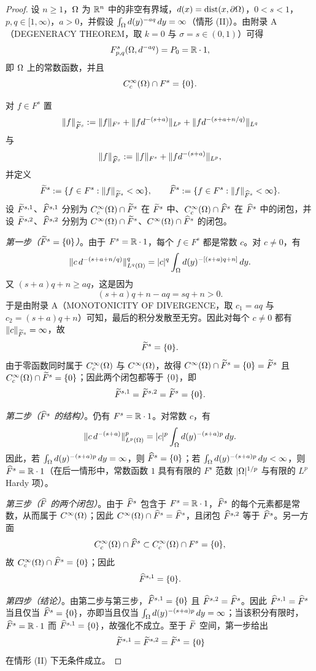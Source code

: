 \begin{proof}
设 $n\ge 1$，$\Omega$ 为 $\mathbb{R}^n$ 中的非空有界域，$d(x)=\operatorname{dist}(x,\partial\Omega)$，$0<s<1$，$p,q\in[1,\infty)$，$a>0$，并假设 $\int_\Omega d(y)^{-aq}\,dy=\infty$（情形 (II)）。由附录 A（DEGENERACY THEOREM，取 $k=0$ 与 $\sigma=s\in(0,1)$）可得
\[
  F^s_{p,q}(\Omega,d^{-aq})=P_0=\mathbb{R}\cdot 1 ,
\]
即 $\Omega$ 上的常数函数，并且
\[
  C_c^\infty(\Omega)\cap F^s=\{0\} .
\]

对 $f\in F^s$ 置
\[
  \|f\|_{\widetilde F^s}:=\|f\|_{F^s}+\|f d^{-(s+a)}\|_{L^p}+\|f d^{-(s+a+n/q)}\|_{L^q}
\]
与
\[
  \|f\|_{\widehat F^s}:=\|f\|_{F^s}+\|f d^{-(s+a)}\|_{L^p} ,
\]
并定义
\[
  \widetilde F^s:=\{f\in F^s : \|f\|_{\widetilde F^s}<\infty\},
  \qquad
  \widehat F^s:=\{f\in F^s : \|f\|_{\widehat F^s}<\infty\} .
\]
设 $\widetilde F^{s,1}$、$\widehat F^{s,1}$ 分别为 $C_c^\infty(\Omega)\cap\widetilde F^s$ 在 $\widetilde F^s$ 中、$C_c^\infty(\Omega)\cap\widehat F^s$ 在 $\widehat F^s$ 中的闭包，并设 $\widetilde F^{s,2}$、$\widehat F^{s,2}$ 分别为 $C^\infty(\Omega)\cap\widetilde F^s$、$C^\infty(\Omega)\cap\widehat F^s$ 的闭包。

\emph{第一步（$\widetilde F^s=\{0\}$）}。由于 $F^s=\mathbb{R}\cdot 1$，每个 $f\in F^s$ 都是常数 $c$。对 $c\ne 0$，有
\[
  \|c\,d^{-(s+a+n/q)}\|^q_{L^q(\Omega)}
  =|c|^q\int_\Omega d(y)^{-[(s+a)q+n]}\,dy .
\]
又 $(s+a)q+n\ge aq$，这是因为
\[
  (s+a)q+n-aq=sq+n>0 .
\]
于是由附录 A（MONOTONICITY OF DIVERGENCE，取 $c_1=aq$ 与 $c_2=(s+a)q+n$）可知，最后的积分发散至无穷。因此对每个 $c\ne 0$ 都有 $\|c\|_{\widetilde F^s}=\infty$，故
\[
  \widetilde F^s=\{0\} .
\]
由于零函数同时属于 $C_c^\infty(\Omega)$ 与 $C^\infty(\Omega)$，故得 $C^\infty(\Omega)\cap\widetilde F^s=\{0\}=\widetilde F^s$ 且 $C_c^\infty(\Omega)\cap\widetilde F^s=\{0\}$；因此两个闭包都等于 $\{0\}$，即
\[
  \widetilde F^{s,1}=\widetilde F^{s,2}=\widetilde F^s=\{0\} .
\]

\emph{第二步（$\widehat F^s$ 的结构）}。仍有 $F^s=\mathbb{R}\cdot 1$。对常数 $c$，有
\[
  \|c\,d^{-(s+a)}\|^p_{L^p(\Omega)}
  =|c|^p\int_\Omega d(y)^{-(s+a)p}\,dy .
\]
因此，若 $\int_\Omega d(y)^{-(s+a)p}\,dy=\infty$，则 $\widehat F^s=\{0\}$；若 $\int_\Omega d(y)^{-(s+a)p}\,dy<\infty$，则 $\widehat F^s=\mathbb{R}\cdot 1$（在后一情形中，常数函数 $1$ 具有有限的 $F^s$ 范数 $|\Omega|^{1/p}$ 与有限的 $L^p$ Hardy 项）。

\emph{第三步（$\widehat F$ 的两个闭包）}。由于 $\widehat F^s$ 包含于 $F^s=\mathbb{R}\cdot 1$，$\widehat F^s$ 的每个元素都是常数，从而属于 $C^\infty(\Omega)$；因此 $C^\infty(\Omega)\cap\widehat F^s=\widehat F^s$，且闭包 $\widehat F^{s,2}$ 等于 $\widehat F^s$。另一方面
\[
  C_c^\infty(\Omega)\cap\widehat F^s\subset C_c^\infty(\Omega)\cap F^s=\{0\},
\]
故 $C_c^\infty(\Omega)\cap\widehat F^s=\{0\}$；因此
\[
  \widehat F^{s,1}=\{0\} .
\]

\emph{第四步（结论）}。由第二步与第三步，$\widehat F^{s,1}=\{0\}$ 且 $\widehat F^{s,2}=\widehat F^s$。因此 $\widehat F^{s,1}=\widehat F^s$ 当且仅当 $\widehat F^s=\{0\}$，亦即当且仅当 $\int_\Omega d(y)^{-(s+a)p}\,dy=\infty$；当该积分有限时，$\widehat F^s=\mathbb{R}\cdot 1$ 而 $\widehat F^{s,1}=\{0\}$，故强化不成立。至于 $\widetilde F$ 空间，第一步给出
\[
  \widetilde F^{s,1}=\widetilde F^{s,2}=\widetilde F^s=\{0\}
\]
在情形 (II) 下无条件成立。
\end{proof}

